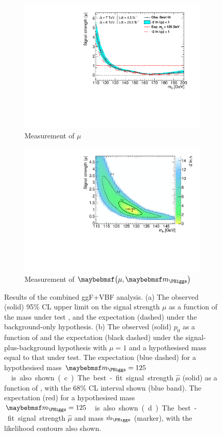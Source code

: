 \begin{figure}[p]
\begin{subfigure}[b]{0.495\textwidth}
		\includegraphics[width=\textwidth,clip=true,trim=0.6cm 0.8cm 0.6cm 0.4cm]{custom_images/limits/mu_combined}
		\caption{Measurement of $\mu$}
		\label{fig:comb_results:mu}
	\end{subfigure}
	\hfill
	\begin{subfigure}[b]{0.495\textwidth}
		\centering
		\includegraphics[width=\textwidth,clip=true,trim=0.6cm 0.8cm 0.6cm 0.4cm]{custom_images/limits/mu_vs_mH_combined}
		\caption{Measurement of $\parenths{\mu, \mH}$}
		\label{fig:comb_results:mu_mH}
	\end{subfigure}
	\caption{Results of the combined ggF+VBF analysis. (a) The observed (solid) 95\% CL 
	upper limit on the signal strength $\mu$ as a function of the mass under test \mH, and 
	the expectation (dashed) under the background-only hypothesis. (b) The observed (solid) 
	$p_0$ as a function of \mH and the expectation (black dashed) under the 
	signal-plus-background hypothesis with $\mu = 1$ and a hypothesised mass equal to that 
	under test.	The expectation (blue dashed) for a hypothesised mass 
	\unit{$\mH = 125$}{\GeV} is also shown. (c) The best-fit signal strength $\hat{\mu}$ 
	(solid) as a function of \mH, with the 68\% CL interval shown (blue band). The 
	expectation (red) for a hypothesised mass \unit{$\mH = 125$}{\GeV} is also shown. 
	(d) The best-fit signal strength $\hat{\mu}$ and mass $\hat{m}_{\PHiggs}$ (marker), with 
	the likelihood contours also shown.}
\end{figure}

